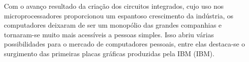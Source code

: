    
	\begin{figure}[h!]
		\centering
	\end{figure}
	\nocite{figura1}
	
Com o avanço resultado da criação dos circuitos integrados, cujo uso nos microprocessadores proporcionou um espantoso crescimento da indústria, os computadores deixaram de ser um monopólio das grandes companhias e tornaram-se muito mais acessíveis a pessoas simples. Isso abriu várias possibilidades para o mercado de computadores pessoais, entre elas destaca-se o surgimento das primeiras placas gráficas produzidas pela IBM (\acrlong{IBM}).

    \begin{figure}[h!]
		\centering
	\end{figure}
	\nocite{figura2}
	
